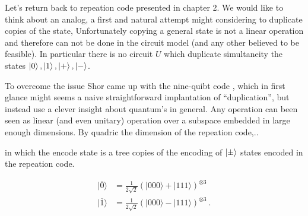 Let's return back to repeation code presented in chapter 2. We would like to think about an analog, a first and natural attempt might considering to duplicate copies of the state, Unfortunately copying a general state is not a linear operation and therefore can not be done in the circuit model (and any other believed to be feasible). In particular there is no circuit $U$ which duplicate simultaneity the states $\ket{0}, \ket{1}, \ket{+}, \ket{-}$.

To overcome the issue Shor came up with the nine-quibt code \cite{Ninequ}, which in first glance might seems a naive straightforward implantation of ``duplication'', but instead use a clever insight about quantum's in general. Any operation can been seen as linear (and even unitary) operation over a subspace embedded in large enough dimensions. By quadric the dimension of the repeation code,..    

in which the encode state is a tree copies of the encoding of $\ket{\pm}$ states  encoded in the repeation code.   


\begin{equation*}
  \begin{split}
    |\overline{0}\rangle&=\frac{1}{2\sqrt{2}}\left(|000\rangle+|111\rangle\right)^{\otimes3}\\
    |\overline{1}\rangle&=\frac{1}{2\sqrt{2}}\left(|000\rangle-|111\rangle\right)^{\otimes3}~.
  \end{split}
\end{equation*}

